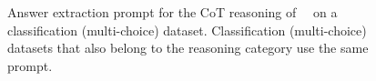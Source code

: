 \begin{figure}[h!]
\centering
\begin{minipage}{0.98\textwidth}
\setlength{\fboxsep}{1em} %
\setlength{\fboxrule}{1pt} %
\caption{Answer extraction prompt for the CoT reasoning of \zeroshotmid\ \method\ on a classification (multi-choice) dataset. Classification (multi-choice) datasets that also belong to the reasoning category use the same prompt.}
\label{table:reasoning-prompts-mc}
\end{minipage}
\end{figure}